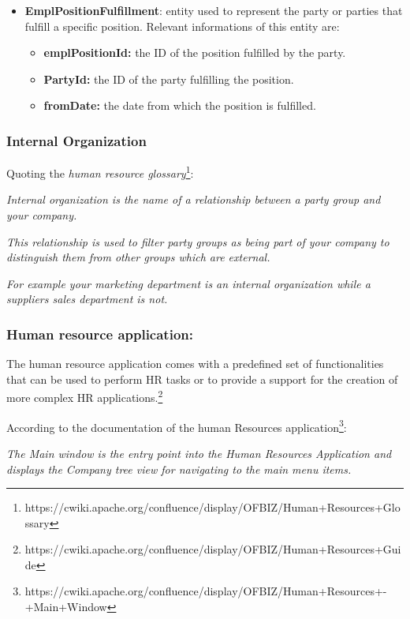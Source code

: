 \begin{itemize}
	\item \textbf{EmplPositionFulfillment}: entity used to represent the party or parties that fulfill a specific position.
	Relevant informations of this entity are:

		\begin{itemize}
			\item \textbf{emplPositionId:} the ID of the position fulfilled by the party.
			\item \textbf{PartyId:} the ID of the party fulfilling the position.
			\item \textbf{fromDate:} the date from which the position is fulfilled.
		\end{itemize}
\end{itemize}

\subsubsection{Internal Organization}
Quoting the \textit{human resource glossary}\footnote{https://cwiki.apache.org/confluence/display/OFBIZ/Human+Resources+Glossary}:

\textit{Internal organization is the name of a relationship between a party group and your company.}

\textit{This relationship is used to filter party groups as being part of your company to distinguish them from other groups which are external.}

\textit{For example your marketing department is an internal organization while a suppliers sales department is not.}

\subsubsection{Human resource application:}

The human resource application comes with a predefined set of functionalities that can be used to perform HR tasks or to provide a support for the creation of more complex HR applications.\footnote{https://cwiki.apache.org/confluence/display/OFBIZ/Human+Resources+Guide} 

According to the documentation of the human Resources application\footnote{https://cwiki.apache.org/confluence/display/OFBIZ/Human+Resources+-+Main+Window}:

\textit{The Main window is the entry point into the Human Resources Application and displays the Company tree view for navigating to the main menu items.}

